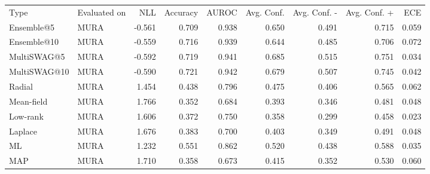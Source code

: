 \begin{tabular}{llrrrrrrr}
Type & Evaluated on & NLL & Accuracy & AUROC & Avg. Conf. & Avg. Conf. - & Avg. Conf. + & ECE \\
Ensemble@5 & MURA & -0.561 & 0.709 & 0.938 & 0.650 & 0.491 & 0.715 & 0.059 \\
Ensemble@10 & MURA & -0.559 & 0.716 & 0.939 & 0.644 & 0.485 & 0.706 & 0.072 \\
MultiSWAG@5 & MURA & -0.592 & 0.719 & 0.941 & 0.685 & 0.515 & 0.751 & 0.034 \\
MultiSWAG@10 & MURA & -0.590 & 0.721 & 0.942 & 0.679 & 0.507 & 0.745 & 0.042 \\
Radial & MURA & 1.454 & 0.438 & 0.796 & 0.475 & 0.406 & 0.565 & 0.062 \\
Mean-field & MURA & 1.766 & 0.352 & 0.684 & 0.393 & 0.346 & 0.481 & 0.048 \\
Low-rank & MURA & 1.606 & 0.372 & 0.750 & 0.358 & 0.299 & 0.458 & 0.023 \\
Laplace & MURA & 1.676 & 0.383 & 0.700 & 0.403 & 0.349 & 0.491 & 0.048 \\
ML & MURA & 1.232 & 0.551 & 0.862 & 0.520 & 0.438 & 0.588 & 0.035 \\
MAP & MURA & 1.710 & 0.358 & 0.673 & 0.415 & 0.352 & 0.530 & 0.060 \\
\end{tabular}
